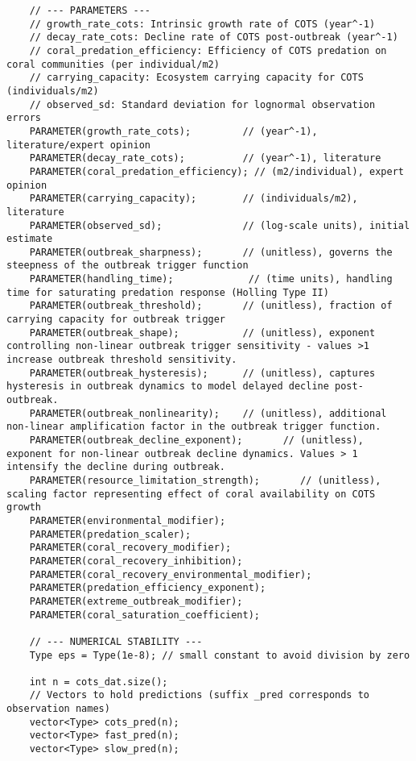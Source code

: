 \begin{lstlisting}
    // --- PARAMETERS ---
    // growth_rate_cots: Intrinsic growth rate of COTS (year^-1)
    // decay_rate_cots: Decline rate of COTS post-outbreak (year^-1)
    // coral_predation_efficiency: Efficiency of COTS predation on coral communities (per individual/m2)
    // carrying_capacity: Ecosystem carrying capacity for COTS (individuals/m2)
    // observed_sd: Standard deviation for lognormal observation errors
    PARAMETER(growth_rate_cots);         // (year^-1), literature/expert opinion
    PARAMETER(decay_rate_cots);          // (year^-1), literature
    PARAMETER(coral_predation_efficiency); // (m2/individual), expert opinion
    PARAMETER(carrying_capacity);        // (individuals/m2), literature
    PARAMETER(observed_sd);              // (log-scale units), initial estimate
    PARAMETER(outbreak_sharpness);       // (unitless), governs the steepness of the outbreak trigger function
    PARAMETER(handling_time);             // (time units), handling time for saturating predation response (Holling Type II)
    PARAMETER(outbreak_threshold);       // (unitless), fraction of carrying capacity for outbreak trigger
    PARAMETER(outbreak_shape);           // (unitless), exponent controlling non-linear outbreak trigger sensitivity - values >1 increase outbreak threshold sensitivity.
    PARAMETER(outbreak_hysteresis);      // (unitless), captures hysteresis in outbreak dynamics to model delayed decline post-outbreak.
    PARAMETER(outbreak_nonlinearity);    // (unitless), additional non-linear amplification factor in the outbreak trigger function.
    PARAMETER(outbreak_decline_exponent);       // (unitless), exponent for non-linear outbreak decline dynamics. Values > 1 intensify the decline during outbreak.
    PARAMETER(resource_limitation_strength);       // (unitless), scaling factor representing effect of coral availability on COTS growth
    PARAMETER(environmental_modifier);
    PARAMETER(predation_scaler);
    PARAMETER(coral_recovery_modifier);
    PARAMETER(coral_recovery_inhibition);
    PARAMETER(coral_recovery_environmental_modifier);
    PARAMETER(predation_efficiency_exponent);
    PARAMETER(extreme_outbreak_modifier);
    PARAMETER(coral_saturation_coefficient);
    
    // --- NUMERICAL STABILITY ---
    Type eps = Type(1e-8); // small constant to avoid division by zero
    
    int n = cots_dat.size();
    // Vectors to hold predictions (suffix _pred corresponds to observation names)
    vector<Type> cots_pred(n);
    vector<Type> fast_pred(n);
    vector<Type> slow_pred(n);
    

\end{lstlisting}
